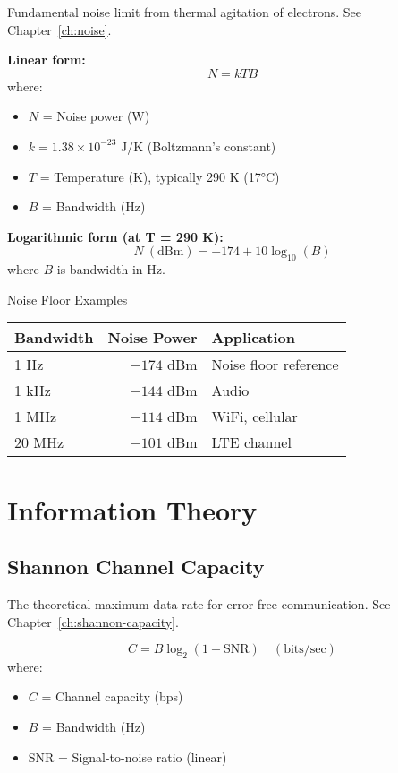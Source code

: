 Fundamental noise limit from thermal agitation of electrons. See Chapter~\ref{ch:noise}.

\textbf{Linear form:}
\begin{equation}
N = kTB
\label{eq:thermal-noise}
\end{equation}
where:
\begin{itemize}
\item $N$ = Noise power (W)
\item $k = 1.38 \times 10^{-23}$ J/K (Boltzmann's constant)
\item $T$ = Temperature (K), typically 290 K (17°C)
\item $B$ = Bandwidth (Hz)
\end{itemize}

\textbf{Logarithmic form (at T = 290 K):}
\begin{equation}
N\ (\text{dBm}) = -174 + 10\log_{10}(B)
\label{eq:thermal-noise-db}
\end{equation}
where $B$ is bandwidth in Hz.

\begin{calloutbox}{Noise Floor Examples}
\begin{tabular}{@{}lrl@{}}
\toprule
Bandwidth & Noise Power & Application \\
\midrule
1 Hz & $-174$ dBm & Noise floor reference \\
1 kHz & $-144$ dBm & Audio \\
1 MHz & $-114$ dBm & WiFi, cellular \\
20 MHz & $-101$ dBm & LTE channel \\
\bottomrule
\end{tabular}
\end{calloutbox}

\section{Information Theory}
\label{sec:information-theory}

\subsection{Shannon Channel Capacity}
\label{sec:shannon-capacity}

The theoretical maximum data rate for error-free communication. See Chapter~\ref{ch:shannon-capacity}.

\begin{equation}
C = B \log_2(1 + \text{SNR}) \quad (\text{bits/sec})
\label{eq:shannon-capacity}
\end{equation}
where:
\begin{itemize}
\item $C$ = Channel capacity (bps)
\item $B$ = Bandwidth (Hz)
\item SNR = Signal-to-noise ratio (linear)
\end{itemize}

